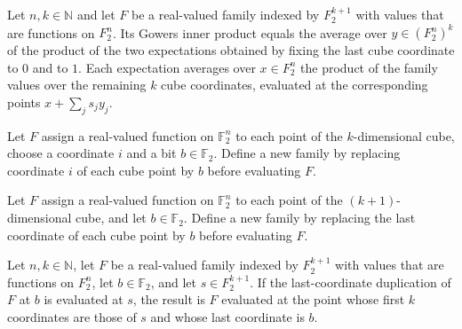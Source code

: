 \begin{theorem}
\label{FABL.gowersInner_succ}
\leanok
{}
Let $n,k\in\mathbb N$ and let $F$ be a real-valued family indexed by $F_2^{k+1}$ with
values that are functions on $F_2^n$. Its Gowers inner product equals the average over
$y\in(F_2^n)^k$ of the product of the two expectations obtained by fixing the last cube
coordinate to $0$ and to $1$. Each expectation averages over $x\in F_2^n$ the product of
the family values over the remaining $k$ cube coordinates, evaluated at the
corresponding points $x+\sum_j s_jy_j$.
\end{theorem}

\begin{definition}
\label{FABL.gowersDuplicateAt}
\leanok
{}
Let $F$ assign a real-valued function on $\mathbb F_2^n$ to each point of the
$k$-dimensional cube, choose a coordinate $i$ and a bit $b\in\mathbb F_2$. Define a new
family by replacing coordinate $i$ of each cube point by $b$ before evaluating $F$.
\end{definition}

\begin{definition}
\label{FABL.gowersLastDuplicate}
\leanok
{}
Let $F$ assign a real-valued function on $\mathbb F_2^n$ to each point of the
$(k+1)$-dimensional cube, and let $b\in\mathbb F_2$. Define a new family by replacing
the last coordinate of each cube point by $b$ before evaluating $F$.
\end{definition}

\begin{theorem}
\label{FABL.gowersLastDuplicate_apply}
\leanok
{}
Let $n,k\in\mathbb N$, let $F$ be a real-valued family indexed by $F_2^{k+1}$ with
values that are functions on $F_2^n$, let $b\in\mathbb F_2$, and let $s\in F_2^{k+1}$.
If the last-coordinate duplication of $F$ at $b$ is evaluated at $s$, the result is $F$
evaluated at the point whose first $k$ coordinates are those of $s$ and whose last
coordinate is $b$.
\end{theorem}

